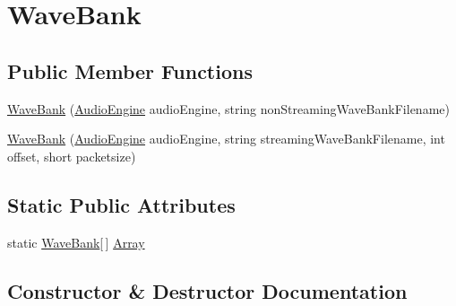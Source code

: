 \hypertarget{classMicrosoft_1_1Xna_1_1Framework_1_1Audio_1_1WaveBank}{}\section{Wave\+Bank}
\label{classMicrosoft_1_1Xna_1_1Framework_1_1Audio_1_1WaveBank}
\subsection*{Public Member Functions}
\begin{DoxyCompactItemize}
\item 
\hyperlink{classMicrosoft_1_1Xna_1_1Framework_1_1Audio_1_1WaveBank_ab89841ad865961ab05cc2513c7805485}{Wave\+Bank} (\hyperlink{classMicrosoft_1_1Xna_1_1Framework_1_1Audio_1_1AudioEngine}{Audio\+Engine} audio\+Engine, string non\+Streaming\+Wave\+Bank\+Filename)
\item 
\hyperlink{classMicrosoft_1_1Xna_1_1Framework_1_1Audio_1_1WaveBank_ad20a947c4647efb7c42f7d02927519c8}{Wave\+Bank} (\hyperlink{classMicrosoft_1_1Xna_1_1Framework_1_1Audio_1_1AudioEngine}{Audio\+Engine} audio\+Engine, string streaming\+Wave\+Bank\+Filename, int offset, short packetsize)
\end{DoxyCompactItemize}
\subsection*{Static Public Attributes}
\begin{DoxyCompactItemize}
\item 
static \hyperlink{classMicrosoft_1_1Xna_1_1Framework_1_1Audio_1_1WaveBank}{Wave\+Bank}\mbox{[}$\,$\mbox{]} \hyperlink{classMicrosoft_1_1Xna_1_1Framework_1_1Audio_1_1WaveBank_a4de816c85e53231142e3a26cee0cd74b}{Array}
\end{DoxyCompactItemize}


\subsection{Constructor \& Destructor Documentation}
\hypertarget{classMicrosoft_1_1Xna_1_1Framework_1_1Audio_1_1WaveBank_ab89841ad865961ab05cc2513c7805485}{}
